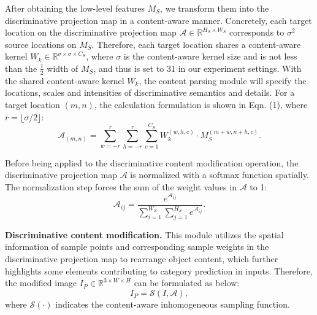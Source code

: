 \documentclass[letterpaper]{article} %
\begin{document}



After obtaining the low-level features $ M_S $, we transform them into the discriminative projection map in a content-aware manner. Concretely, each target location on the discriminative projection map $ \mathcal{A} \in \mathbb{R}^{H_S \times W_S} $ corresponds to $ \sigma^2 $ source locations on $ M_S $. Therefore, each target location shares a content-aware kernel $ W_k \in \mathbb{R}^{ \sigma \times \sigma \times C_S } $, where $ \sigma $ is the content-aware kernel size and is not less than the $ \frac{1}{2} $ width of $ M_S $, and thus is set to 31 in our experiment settings. With the shared content-aware kernel $ W_k $, the content parsing module will specify the locations, scales and intensities of discriminative semantics and details. For a target location $ (m, n) $, the calculation formulation is shown in Eqn. (1), where $ r = \lfloor \sigma/2\rfloor $:
\begin{equation}
\mathcal{A}_{(m,n)} = \sum_{w=-r}^r\sum_{h=-r}^r \sum_{c=1}^{C_S} W_k^{(w,h,c)} \cdot M_S^{(m+w, n+h,c)}.
\end{equation}

Before being applied to the discriminative content modification operation, the discriminative projection map $ \mathcal{A} $ is normalized with a softmax function spatially. The normalization step forces the sum of the weight values in $ \mathcal{A} $ to 1:
\begin{equation}
 \mathcal{A}_{ij}= \frac{e^{\mathcal{A}_{ij}}}{\sum_{i=1}^{W_S}\sum_{j=1}^{H_S}e^{\mathcal{A}_{ij}}}.
\end{equation}

\textbf{Discriminative content modification.}
This module utilizes the spatial information of sample points and corresponding sample weights in the discriminative projection map to rearrange object content, which further highlights some elements contributing to category prediction in inputs. Therefore, the modified image $ I_P \in\mathbb{R}^{3\times W \times H} $ can be formulated as below:
\begin{equation}
I_P = \mathcal{S}(I, \mathcal{A}),
\end{equation}
where $ \mathcal{S}(\cdot) $ indicates the content-aware inhomogeneous sampling function.
\end{document}
